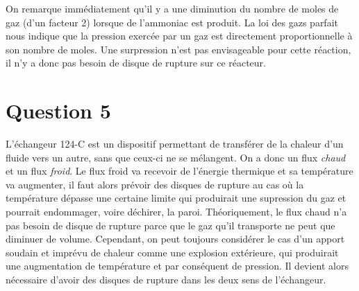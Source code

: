 \documentclass[a4paper,oneside,12pt]{article}
\begin{document}
On remarque immédiatement qu'il y a une diminution du nombre de moles de gaz (d'un facteur 2) 
lorsque de l'ammoniac est produit. La loi des gazs parfait nous indique que la pression
exercée par un gaz est directement proportionnelle à son nombre de moles.
Une surpression n'est pas envisageable pour cette réaction, 
il n'y a donc pas besoin de disque de rupture sur ce réacteur.

\section*{Question 5}

L'échangeur 124-C est un dispositif permettant de transférer de la chaleur d'un fluide
vers un autre, sans que ceux-ci ne se mélangent.
On a donc un flux \emph{chaud} et un flux \emph{froid}. Le flux froid va recevoir de 
l'énergie thermique et sa température va augmenter, il faut alors prévoir des disques 
de rupture au cas où la température dépasse une certaine limite qui produirait une 
supression du gaz et pourrait endommager, voire déchirer, la paroi.
Théoriquement, le flux chaud n'a pas besoin de disque de rupture parce que le gaz qu'il 
transporte ne peut que diminuer de volume. Cependant, on peut toujours considérer le cas
d'un apport soudain et imprévu de chaleur comme une explosion extérieure, qui produirait
une augmentation de température et par conséquent de pression. 
Il devient alors nécessaire d'avoir des disques de rupture dans les deux sens de l'échangeur.
\end{document}
